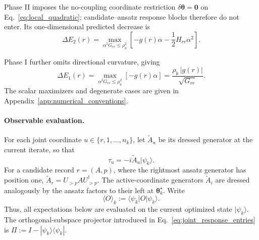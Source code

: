 \documentclass[
  reprint,
  amsmath,
  amssymb,
  aps,
  pra,
  nofootinbib,
  superscriptaddress,
  floatfix
]{revtex4-2}
\newcommand{\ket}[1]{|#1\rangle}
\newcommand{\bra}[1]{\langle #1|}
\begin{document}
Phase II imposes the no-coupling coordinate restriction
\(\delta\boldsymbol\theta=\mathbf 0\) on
Eq.~\eqref{eq:local_quadratic}; candidate--ansatz response blocks therefore do
not enter. Its one-dimensional predicted decrease is
\begin{equation}
\Delta E_2(r)=
\max_{\alpha^2G_{rr}\le\rho_k^2}
\left[
-g(r)\alpha
-\frac12H_{rr}\alpha^2
\right].
\label{eq:phase2_gain}
\end{equation}

Phase I further omits directional curvature, giving
\begin{equation}
\Delta E_1(r)
=\max_{\alpha^2G_{rr}\le\rho_k^2}[-g(r)\alpha]
=\frac{\rho_k\,|g(r)|}{\sqrt{G_{rr}}}.
\label{eq:phase1_gain}
\end{equation}
The scalar maximizers and degenerate cases are given in
Appendix~\ref{app:numerical_conventions}.

\paragraph*{Observable evaluation.}
%
For each joint coordinate \(u\in\{r,1,\ldots,n_k\}\), let
\(\widetilde A_u\) be its dressed generator at the current iterate, so that
\begin{equation*}
\tau_u=-i\widetilde A_u\ket{\psi_k}.
\end{equation*}
For a candidate record \(r=(A,p)\), where the rightmost ansatz generator has
position one,
\(\widetilde A_r=U_{>p}AU_{>p}^{\dagger}\). The active-coordinate generators
\(\widetilde A_i\) are dressed analogously by the ansatz factors to their left
at \(\boldsymbol\theta_k^\star\). Write
\begin{equation*}
\langle O\rangle_k:=\langle\psi_k|O|\psi_k\rangle.
\end{equation*}
Thus, all expectations below are evaluated on the current optimized state
\(\ket{\psi_k}\). The orthogonal-subspace projector introduced in
Eq.~\eqref{eq:joint_response_entries} is
\(\Pi:=I-\ket{\psi_k}\!\bra{\psi_k}\).
\end{document}
